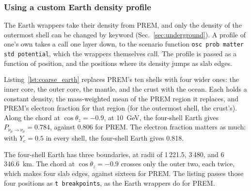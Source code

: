 \documentclass[final,5p,times,twocolumn,sort,compress]{elsarticle}
\makeatletter
\DeclareRobustCommand{\_}{%
  \ifmmode\nfss@text{\textunderscore}\else\textunderscore\allowbreak\fi}
\makeatother
\begin{document}

\subsubsection{Using a custom Earth density profile}
\label{sec:custom_earth}

The Earth wrappers take their density from PREM, and only the density of the outermost shell can be changed by keyword (Sec.~\ref{sec:underground}). A profile of one's own takes a call one layer down, to the scenario function {\tt osc\_prob\_matter\_std\_potential}, which the wrappers themselves call. The profile is passed as a function of position, and the positions where its density jumps as slab edges.

Listing~\ref{lst:coarse_earth} replaces PREM's ten shells with four wider ones: the inner core, the outer core, the mantle, and the crust with the ocean. Each holds a constant density, the mass-weighted mean of the PREM region it replaces, and PREM's electron fraction for that region (for the outermost shell, the crust's). Along the chord at $\cos \theta_z = -0.9$, at 10~GeV, the four-shell Earth gives $P_{\nu_\mu \to \nu_\mu} = 0.784$, against 0.806 for PREM. The electron fraction matters as much: with $Y_e = 0.5$ in every shell, the four-shell Earth gives 0.818.

The four-shell Earth has three boundaries, at radii of 1\,221.5, 3\,480, and 6\,346.6~km. The chord at $\cos \theta_z = -0.9$ crosses only the outer two, each twice, which makes four slab edges, against sixteen for PREM. The listing passes those four positions as {\tt t\_breakpoints}, as the Earth wrappers do for PREM.
\end{document}
